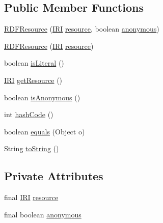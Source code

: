 \subsection*{Public Member Functions}
\begin{DoxyCompactItemize}
\item 
\hyperlink{classorg_1_1semanticweb_1_1owlapi_1_1io_1_1_r_d_f_resource_acc909b75eb5b702651fa77bfc7bbb170}{R\-D\-F\-Resource} (\hyperlink{classorg_1_1semanticweb_1_1owlapi_1_1model_1_1_i_r_i}{I\-R\-I} \hyperlink{classorg_1_1semanticweb_1_1owlapi_1_1io_1_1_r_d_f_resource_aca318e939b6a59be242e42f397f6aa6f}{resource}, boolean \hyperlink{classorg_1_1semanticweb_1_1owlapi_1_1io_1_1_r_d_f_resource_aaf68492e57a6adddbd41ffa5e9e45713}{anonymous})
\item 
\hyperlink{classorg_1_1semanticweb_1_1owlapi_1_1io_1_1_r_d_f_resource_a296a21237837fa02ef9a56fb20855656}{R\-D\-F\-Resource} (\hyperlink{classorg_1_1semanticweb_1_1owlapi_1_1model_1_1_i_r_i}{I\-R\-I} \hyperlink{classorg_1_1semanticweb_1_1owlapi_1_1io_1_1_r_d_f_resource_aca318e939b6a59be242e42f397f6aa6f}{resource})
\item 
boolean \hyperlink{classorg_1_1semanticweb_1_1owlapi_1_1io_1_1_r_d_f_resource_a03b66de686eb2787be94d5c885d5861d}{is\-Literal} ()
\item 
\hyperlink{classorg_1_1semanticweb_1_1owlapi_1_1model_1_1_i_r_i}{I\-R\-I} \hyperlink{classorg_1_1semanticweb_1_1owlapi_1_1io_1_1_r_d_f_resource_a944cd431e82181e34516374f358f789c}{get\-Resource} ()
\item 
boolean \hyperlink{classorg_1_1semanticweb_1_1owlapi_1_1io_1_1_r_d_f_resource_ad4d36c8d4d096cc2c103415a12d5535b}{is\-Anonymous} ()
\item 
int \hyperlink{classorg_1_1semanticweb_1_1owlapi_1_1io_1_1_r_d_f_resource_a8699946ace368d2526490c62fa438555}{hash\-Code} ()
\item 
boolean \hyperlink{classorg_1_1semanticweb_1_1owlapi_1_1io_1_1_r_d_f_resource_ae6f44647603860ca8f46c7fe2ce799de}{equals} (Object o)
\item 
String \hyperlink{classorg_1_1semanticweb_1_1owlapi_1_1io_1_1_r_d_f_resource_aea293ce5dd4e1bc5b44cb00d2b8d7a63}{to\-String} ()
\end{DoxyCompactItemize}
\subsection*{Private Attributes}
\begin{DoxyCompactItemize}
\item 
final \hyperlink{classorg_1_1semanticweb_1_1owlapi_1_1model_1_1_i_r_i}{I\-R\-I} \hyperlink{classorg_1_1semanticweb_1_1owlapi_1_1io_1_1_r_d_f_resource_aca318e939b6a59be242e42f397f6aa6f}{resource}
\item 
final boolean \hyperlink{classorg_1_1semanticweb_1_1owlapi_1_1io_1_1_r_d_f_resource_aaf68492e57a6adddbd41ffa5e9e45713}{anonymous}
\end{DoxyCompactItemize}
